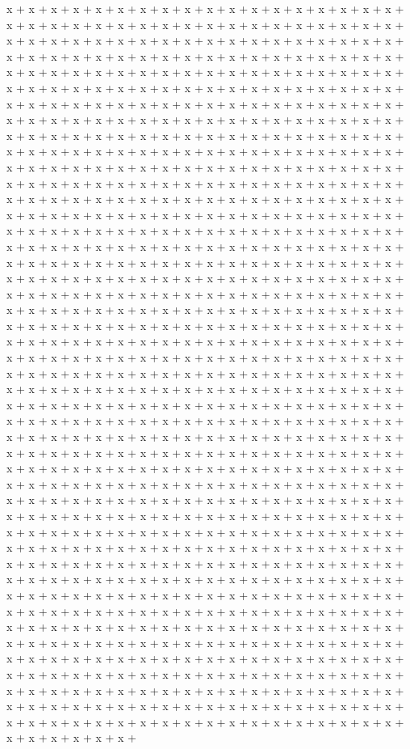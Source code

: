 x + x + x + x + x + x + x + x + x + x + x + x + x + x + x + x + x + x + x + x + x + x + x + x + x + x + x + x + x + x + x + x + x + x + x + x + x + x + x + x + x + x + x + x + x + x + x + x + x + x + x + x + x + x + x + x + x + x + x + x + x + x + x + x + x + x + x + x + x + x + x + x + x + x + x + x + x + x + x + x + x + x + x + x + x + x + x + x + x + x + x + x + x + x + x + x + x + x + x + x + x + x + x + x + x + x + x + x + x + x + x + x + x + x + x + x + x + x + x + x + x + x + x + x + x + x + x + x + x + x + x + x + x + x + x + x + x + x + x + x + x + x + x + x + x + x + x + x + x + x + x + x + x + x + x + x + x + x + x + x + x + x + x + x + x + x + x + x + x + x + x + x + x + x + x + x + x + x + x + x + x + x + x + x + x + x + x + x + x + x + x + x + x + x + x + x + x + x + x + x + x + x + x + x + x + x + x + x + x + x + x + x + x + x + x + x + x + x + x + x + x + x + x + x + x + x + x + x + x + x + x + x + x + x + x + x + x + x + x + x + x + x + x + x + x + x + x + x + x + x + x + x + x + x + x + x + x + x + x + x + x + x + x + x + x + x + x + x + x + x + x + x + x + x + x + x + x + x + x + x + x + x + x + x + x + x + x + x + x + x + x + x + x + x + x + x + x + x + x + x + x + x + x + x + x + x + x + x + x + x + x + x + x + x + x + x + x + x + x + x + x + x + x + x + x + x + x + x + x + x + x + x + x + x + x + x + x + x + x + x + x + x + x + x + x + x + x + x + x + x + x + x + x + x + x + x + x + x + x + x + x + x + x + x + x + x + x + x + x + x + x + x + x + x + x + x + x + x + x + x + x + x + x + x + x + x + x + x + x + x + x + x + x + x + x + x + x + x + x + x + x + x + x + x + x + x + x + x + x + x + x + x + x + x + x + x + x + x + x + x + x + x + x + x + x + x + x + x + x + x + x + x + x + x + x + x + x + x + x + x + x + x + x + x + x + x + x + x + x + x + x + x + x + x + x + x + x + x + x + x + x + x + x + x + x + x + x + x + x + x + x + x + x + x + x + x + x + x + x + x + x + x + x + x + x + x + x + x + x + x + x + x + x + x + x + x + x + x + x + x + x + x + x + x + x + x + x + x + x + x + x + x + x + x + x + x + x + x + x + x + x + x + x + x + x + x + x + x + x + x + x + x + x + x + x + x + x + x + x + x + x + x + x + x + x + x + x + x + x + x + x + x + x + x + x + x + x + x + x + x + x + x + x + x + x + x + x + x + x + x + x + x + x + x + x + x + x + x + x + x + x + x + x + x + x + x + x + x + x + x + x + x + x + x + x + x + x + x + x + x + x + x + x + x + x + x + x + x + x + x + x + x + x + x + x + x + x + x + x + x + x + x + x + x + x + x + x + x + x + x + x + x + x + x + x + x + x + x + x + x + x + x + x + x + x + x + x + x + x + x + x + x + x + x + x + x + x + x + x + x + x + x + x + x + x + x + x + x + x + x + x + x + x + x + x + x + x + x + x + x + x + x + x + x + x + x + x + x + x + x + x + x + x + x + x + x + x + x + x + x + x + x + x + x + x + x + x + x + x + x + x + x + x + x + x + x + x + x + x + x + x + x + x + x + x + x + x + x + x + x + x + x + x + x + x + x + x + x + x + x + x + x + x + x + x + x + x + x + x + x + x + x + x + x + x + x + x + x + x + x + x + x + x + x + x + x + x + x + x + x + x + x + x + x + x + x + x + x + x + x + x + x + x + x + x + x + x + x + x + x + x + x + x + x + x + x + x + x + x + x + x + x + x + x + x + x + x + x + x + x + x + x + x + x + x + x + x + x + x + x + x + x + x + x + x + x + x + x + x + x + x + x + x + x + 